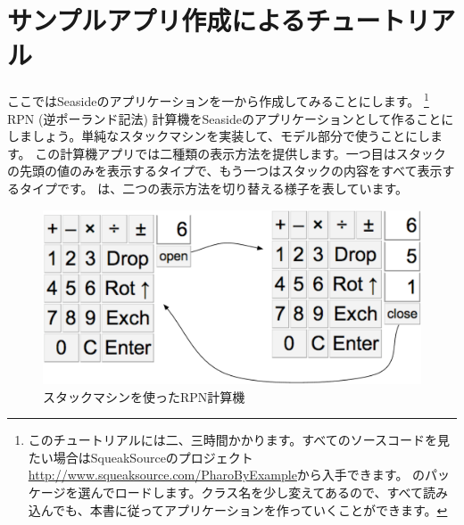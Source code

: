 \documentclass[a4paper,10pt,twoside]{book}
\begin{document}

\section{サンプルアプリ作成によるチュートリアル}


ここではSeasideのアプリケーションを一から作成してみることにします。 \footnote{このチュートリアルには二、三時間かかります。すべてのソースコードを見たい場合はSqueakSourceのプロジェクト \url{http://www.squeaksource.com/PharoByExample}から入手できます。
のパッケージを選んでロードします。クラス名を少し変えてあるので、すべて読み込んでも、本書に従ってアプリケーションを作っていくことができます。}
RPN (逆ポーランド記法) 計算機をSeasideのアプリケーションとして作ることにしましょう。単純なスタックマシンを実装して、モデル部分で使うことにします。
この計算機アプリでは二種類の表示方法を提供します。一つ目はスタックの先頭の値のみを表示するタイプで、もう一つはスタックの内容をすべて表示するタイプです。
は、二つの表示方法を切り替える様子を表しています。

\begin{figure}[ht]
\begin{center}
\includegraphics[width=\textwidth]{stackMachine}
\caption{スタックマシンを使ったRPN計算機}
\end{center}
\end{figure}
\end{document}
